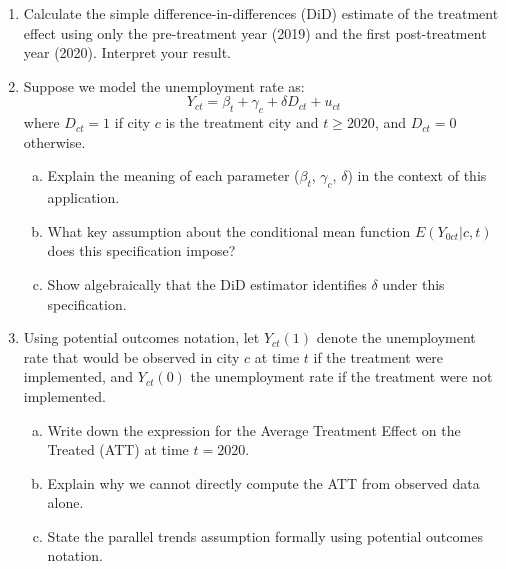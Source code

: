 \documentclass[12pt,a4paper]{article}
\begin{document}
\begin{enumerate}
\item Calculate the simple difference-in-differences (DiD) estimate of the treatment effect using only the pre-treatment year (2019) and the first post-treatment year (2020). Interpret your result.

\item Suppose we model the unemployment rate as:
\begin{equation}
\label{eq:did}
Y_{ct}=\beta_{t}+\gamma_{c}+\delta D_{ct}+u_{ct}
\end{equation}
where $D_{ct}=1$ if city $c$ is the treatment city and $t \geq 2020$, and $D_{ct}=0$ otherwise.
\begin{enumerate}[(a)]
\item Explain the meaning of each parameter ($\beta_{t}$, $\gamma_{c}$, $\delta$) in the context of this application.
\item What key assumption about the conditional mean function $E(Y_{0ct}|c,t)$ does this specification impose?
\item Show algebraically that the DiD estimator identifies $\delta$ under this specification.
\end{enumerate}

\item Using potential outcomes notation, let $Y_{ct}(1)$ denote the unemployment rate that would be observed in city $c$ at time $t$ if the treatment were implemented, and $Y_{ct}(0)$ the unemployment rate if the treatment were not implemented.
\begin{enumerate}[(a)]
\item Write down the expression for the Average Treatment Effect on the Treated (ATT) at time $t=2020$.
\item Explain why we cannot directly compute the ATT from observed data alone.
\item State the parallel trends assumption formally using potential outcomes notation.
\end{enumerate}

\end{enumerate}
\end{document}
